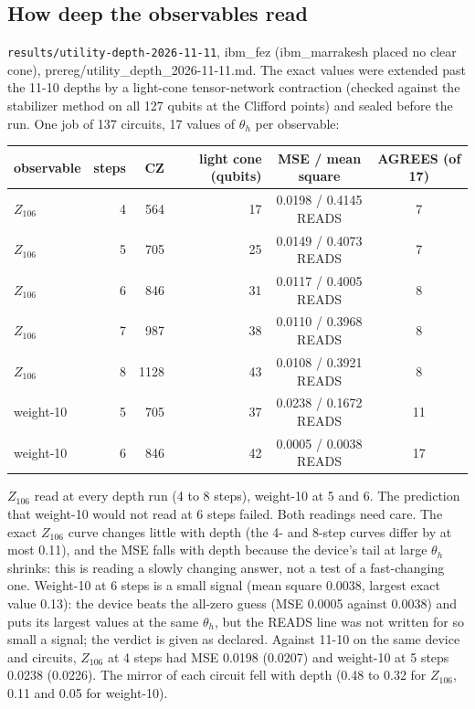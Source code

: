 
\subsection{How deep the observables read}\label{sec:utility-depth}
\texttt{results/utility-depth-2026-11-11}, ibm\_fez (ibm\_marrakesh placed no clear cone), prereg/utility\_depth\_2026-11-11.md.
The exact values were extended past the 11-10 depths by a light-cone tensor-network contraction (checked against the
stabilizer method on all 127 qubits at the Clifford points) and sealed before the run. One job of 137 circuits,
17 values of $\theta_h$ per observable:

\begin{center}\small
\begin{tabular}{lrrrcc}
\hline
observable & steps & CZ & light cone (qubits) & MSE / mean square & AGREES (of 17) \\
\hline
$Z_{106}$ & 4 & 564 & 17 & 0.0198 / 0.4145 READS & 7 \\
$Z_{106}$ & 5 & 705 & 25 & 0.0149 / 0.4073 READS & 7 \\
$Z_{106}$ & 6 & 846 & 31 & 0.0117 / 0.4005 READS & 8 \\
$Z_{106}$ & 7 & 987 & 38 & 0.0110 / 0.3968 READS & 8 \\
$Z_{106}$ & 8 & 1128 & 43 & 0.0108 / 0.3921 READS & 8 \\
weight-10 & 5 & 705 & 37 & 0.0238 / 0.1672 READS & 11 \\
weight-10 & 6 & 846 & 42 & 0.0005 / 0.0038 READS & 17 \\
\hline
\end{tabular}
\end{center}

$Z_{106}$ read at every depth run (4 to 8 steps), weight-10 at 5 and 6. The prediction that weight-10 would not read at
6 steps failed. Both readings need care. The exact $Z_{106}$ curve changes little with depth (the 4- and 8-step
curves differ by at most 0.11), and the MSE falls with depth because the device's tail at large $\theta_h$ shrinks: this
is reading a slowly changing answer, not a test of a fast-changing one. Weight-10 at 6 steps is a small signal (mean
square 0.0038, largest exact value 0.13): the device beats the all-zero guess (MSE 0.0005 against 0.0038) and puts its
largest values at the same $\theta_h$, but the READS line was not written for so small a signal; the verdict is given
as declared. Against 11-10 on the same device and circuits, $Z_{106}$ at 4 steps had MSE 0.0198 (0.0207) and weight-10
at 5 steps 0.0238 (0.0226). The mirror of each circuit fell with depth (0.48 to 0.32 for $Z_{106}$, 0.11 and 0.05 for
weight-10).
